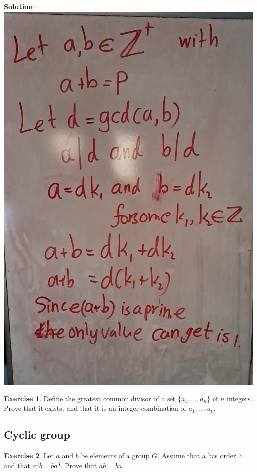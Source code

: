 \documentclass[
]{book}
\theoremstyle{definition}
\theoremstyle{definition}
\theoremstyle{definition}
\newtheorem{exercise}{Exercise}[chapter]
\theoremstyle{definition}
\theoremstyle{remark}
\begin{document}
\textbf{Solution}:
\includegraphics{figures/ch_2/fig21.jpg}

\begin{exercise}
\protect\hypertarget{exr:unnamed-chunk-55}{}\label{exr:unnamed-chunk-55}Define the greatest common divisor of a set \(\{a_1, ..., a_n\}\) of \(n\) integers. Prove that it
exists, and that it is an integer combination of \(a_1, ..., a_n\).
\end{exercise}

\hypertarget{cyclic-group}{%
\subsection{Cyclic group}\label{cyclic-group}}

\begin{exercise}
\protect\hypertarget{exr:unnamed-chunk-56}{}\label{exr:unnamed-chunk-56}Let \(a\) and \(b\) be elements of a group \(G\). Assume that a has order \(7\) and that \(a^3b = ba^3\).
Prove that \(a b = ba\).
\end{exercise}
\end{document}
